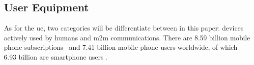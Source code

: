 \documentclass[11pt,a4paper]{article}
\begin{document}
\subsection{User Equipment}\label{subsec:UEInfluence}
As for the \acrlong{ue}, two categories will be differentiate between in this paper: devices actively used by humans and \acrfull{m2m} communications.
There are 8.59 billion mobile phone subscriptions~\citep{mobilephonesWorld} and 7.41 billion mobile phone users worldwide, of which 6.93 billion are smartphone users \citep{mobileusersWorld}.
\end{document}
